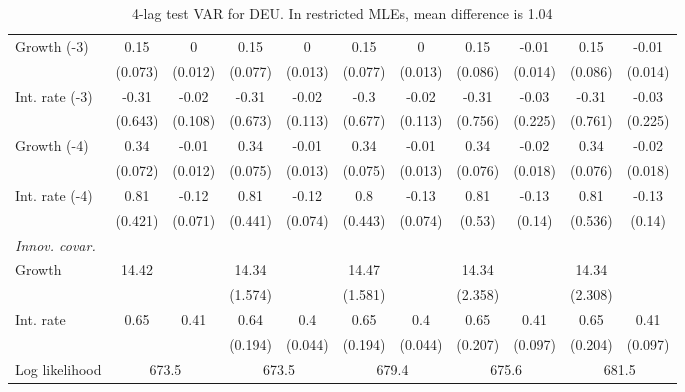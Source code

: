 \begin{table}[htbp]
\begin{tabular}{@{\extracolsep{4pt}}lcccccccccc@{}}
\quad Growth (-3) 	 &0.15 	 & 0 	 & 0.15 	 & 0 	 & 0.15 	 & 0 	 & 0.15 	 & -0.01 	 & 0.15 	 & -0.01	 \\ 
 		 & (0.073) 	 & (0.012) 	 & (0.077) 	 & (0.013) 	 & (0.077) 	 & (0.013) 	 & (0.086) 	 & (0.014) 	 & (0.086) 	 & (0.014) 	 \\ 
\quad Int. rate (-3) 	 &-0.31 	 & -0.02 	 & -0.31 	 & -0.02 	 & -0.3 	 & -0.02 	 & -0.31 	 & -0.03 	 & -0.31 	 & -0.03	 \\ 
 		 & (0.643) 	 & (0.108) 	 & (0.673) 	 & (0.113) 	 & (0.677) 	 & (0.113) 	 & (0.756) 	 & (0.225) 	 & (0.761) 	 & (0.225) 	 \\ 
\quad Growth (-4) 	 &0.34 	 & -0.01 	 & 0.34 	 & -0.01 	 & 0.34 	 & -0.01 	 & 0.34 	 & -0.02 	 & 0.34 	 & -0.02	 \\ 
 		 & (0.072) 	 & (0.012) 	 & (0.075) 	 & (0.013) 	 & (0.075) 	 & (0.013) 	 & (0.076) 	 & (0.018) 	 & (0.076) 	 & (0.018) 	 \\ 
\quad Int. rate (-4) 	 &0.81 	 & -0.12 	 & 0.81 	 & -0.12 	 & 0.8 	 & -0.13 	 & 0.81 	 & -0.13 	 & 0.81 	 & -0.13	 \\ 
 		 & (0.421) 	 & (0.071) 	 & (0.441) 	 & (0.074) 	 & (0.443) 	 & (0.074) 	 & (0.53) 	 & (0.14) 	 & (0.536) 	 & (0.14) 	 \\ 
\rule{0pt}{4ex} \emph{Innov. covar.}  	 & 	 & 	 & 	 & 	 & 	 & 	 & 	 & 	 & 	 &\\ 
\quad Growth 	 &14.42 	 &  	 & 14.34 	 &  	 & 14.47 	 &  	 & 14.34 	 &  	 & 14.34 	 & 	 \\ 
 		 &  	 &  	 & (1.574) 	 &  	 & (1.581) 	 &  	 & (2.358) 	 &  	 & (2.308) 	 &  	 \\ 
\quad Int. rate 	 &0.65 	 & 0.41 	 & 0.64 	 & 0.4 	 & 0.65 	 & 0.4 	 & 0.65 	 & 0.41 	 & 0.65 	 & 0.41	 \\ 
 		 &  	 &  	 & (0.194) 	 & (0.044) 	 & (0.194) 	 & (0.044) 	 & (0.207) 	 & (0.097) 	 & (0.204) 	 & (0.097) 	 \\ 
 \hline \rule{0pt}{4ex} 
  Log likelihood 	 &\multicolumn{2}{c}{673.5} 	 & \multicolumn{2}{c}{673.5} 	 & \multicolumn{2}{c}{679.4} 	 & \multicolumn{2}{c}{675.6} 	 & \multicolumn{2}{c}{681.5}\\ 

 \hline 	\end{tabular}		\caption{4-lag test VAR for DEU. In restricted MLEs, mean difference is 1.04}
		\label{tab:DEU4lag}

\end{table}